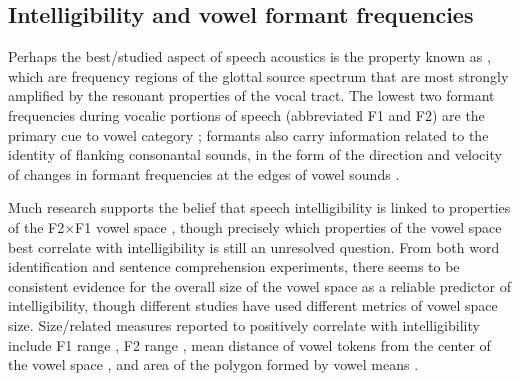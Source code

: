 \subsection{Intelligibility and vowel formant frequencies\label{sec:IntelVowel}}
Perhaps the best\-/studied aspect of speech acoustics is the property known as , which are frequency regions of the glottal source spectrum that are most strongly amplified by the resonant properties of the vocal tract.  The lowest two formant frequencies during vocalic portions of speech (abbreviated F1 and F2) are the primary cue to vowel category \citep{SyrdalGopal1986}; formants also carry information related to the identity of flanking consonantal sounds, in the form of the direction and velocity of changes in formant frequencies at the edges of vowel sounds \citep{DelattreEtAl1955}.

Much research supports the belief that speech intelligibility is linked to properties of the F2×F1 vowel space \citep[\eg,][]{BondMoore1994, BradlowEtAl1996, HazanMarkham2004, Neel2008}, though precisely which properties of the vowel space best correlate with intelligibility is still an unresolved question.  From both word identification and sentence comprehension experiments, there seems to be consistent evidence for the overall size of the vowel space as a reliable predictor of intelligibility, though different studies have used different metrics of vowel space size.  Size\-/related measures reported to positively correlate with intelligibility include F1 range \citep{BradlowEtAl1996}, F2 range \citep{HazanMarkham2004}, mean distance of vowel tokens from the center of the vowel space \citep{BradlowEtAl1996}, and area of the polygon formed by vowel means \citep{BradlowEtAl1996, Neel2008, McCloyEtAl2012}.\footnotemark{}%

